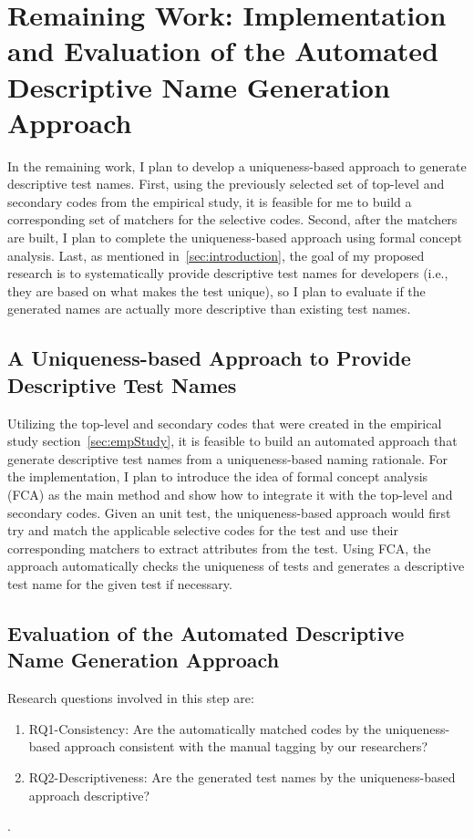 \section{Remaining Work: Implementation and Evaluation of the Automated Descriptive Name Generation Approach}
\label{sec:remaining-work}

In the remaining work, I plan to develop a uniqueness-based approach to generate descriptive test names.
%
First, using the previously selected set of top-level and secondary codes from the empirical study, it is feasible for me to build a corresponding set of matchers for the selective codes.
%
Second, after the matchers are built, I plan to complete the uniqueness-based approach using formal concept analysis.
%
Last, as mentioned in~\cref{sec:introduction}, the goal of my proposed research is to systematically provide descriptive test names for developers (i.e., they are based on what makes the test unique), so I plan to evaluate if the generated names are actually more descriptive than existing test names.

\subsection{A Uniqueness-based Approach to Provide Descriptive Test Names}


Utilizing the top-level and secondary codes that were created in the empirical study section~\cref{sec:empStudy}, it is feasible to build an automated approach that generate descriptive test names from a uniqueness-based naming rationale.
%
For the implementation, I plan to introduce the idea of formal concept analysis (FCA) as the main method and show how to integrate it with the top-level and secondary codes.
%
Given an unit test, the uniqueness-based approach would first try and match the applicable selective codes for the test and use their corresponding matchers to extract attributes from the test.
%
Using FCA, the approach automatically checks the uniqueness of tests and generates a descriptive test name for the given test if necessary.


\subsection{Evaluation of the Automated Descriptive Name Generation Approach}


Research questions involved in this step are:
%
\begin{enumerate}
    \item RQ1-Consistency: Are the automatically matched codes by the uniqueness-based approach consistent with the manual tagging by our researchers?
    \item RQ2-Descriptiveness: Are the generated test names by the uniqueness-based approach descriptive?
\end{enumerate}.

